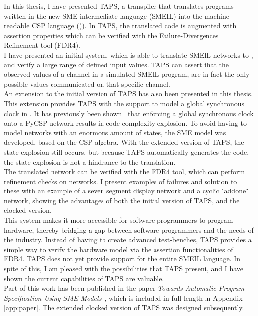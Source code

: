 In this thesis, I have presented TAPS, a transpiler that translates programs written in the
new SME intermediate language (SMEIL) into the machine-readable CSP language ()\cspm{}). In TAPS, the translated \cspm{} code is augmented with assertion
properties which can be verified with the Failure-Divergences Refinement tool
(FDR4).\\
I have presented an initial system, which is able to translate SMEIL networks to
\cspm{}, and verify a large range of defined input values. TAPS can assert that
the observed values of a channel in a simulated SMEIL program, are in fact the
only possible values communicated on that specific channel. \\

An extension to the initial version of TAPS has also been presented in this
thesis. This extension provides TAPS with the support to model a global
synchronous clock in \cspm{}. It has previously been shown~\cite{Skaarup14}
that enforcing a global synchronous clock onto a PyCSP network results in code complexity explosion. To avoid having to model networks with an enormous amount of
states, the SME model was developed, based on the CSP algebra. With the
extended version of TAPS, the state explosion still occurs, but because TAPS automatically generates the \cspm{} code, the state explosion is not a hindrance to the
translation.\\

The translated \cspm{} network can be verified with the FDR4 tool, which can
perform refinement checks on \cspm{} networks. I present examples of failures
and solution to these with an example of a seven segment display network and a
cyclic "addone" network, showing the advantages of both the initial version of TAPS, and the clocked version.\\

This system makes it more accessible for software programmers to program
hardware, thereby bridging a gap between software programmers and the needs
of the industry.
Instead of having to create advanced test-benches, TAPS provides a simple
way to verify the hardware model via the assertion functionalities of FDR4.
TAPS does not yet provide support for the entire SMEIL language. In spite of this,
I am pleased with the possibilities that TAPS present, and I have shown the current capabilities of TAPS are valuable.\\

Part of this work has been published in the paper \textit{Towards Automatic Program Specification Using SME Models}~\cite{TheglerEtAl2018}, which is included in full length in Appendix \ref{app:paper}. The extended clocked version of TAPS was designed subsequently.
